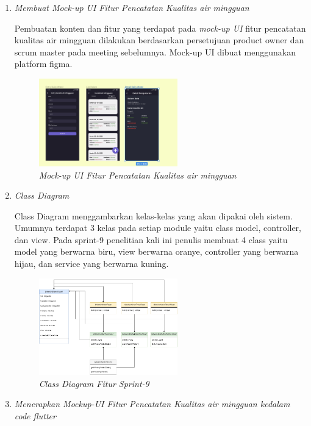 \begin{enumerate}[listparindent=2em]
	
	\item{\textit{Membuat Mock-up UI Fitur Pencatatan Kualitas air mingguan}}
	
	Pembuatan konten dan fitur yang terdapat pada \textit{mock-up UI} fitur pencatatan kualitas air mingguan dilakukan berdasarkan persetujuan product owner dan scrum master pada meeting sebelumnya. Mock-up UI dibuat menggunakan platform figma.
	
	\begin{figure}[H]
	\centering
	\includegraphics[keepaspectratio, width=6cm]{gambar/mockupairmingguan}
	\caption{\textit{Mock-up UI Fitur Pencatatan Kualitas air mingguan}}
	\label{gambar:mockupairmingguan}
	\end{figure}

	\item{\textit{Class Diagram}}
	
	Class Diagram menggambarkan kelas-kelas yang akan dipakai oleh sistem. Umumnya terdapat 3 kelas pada setiap module yaitu class model, controller, dan view. Pada sprint-9 penelitian kali ini penulis membuat 4 class yaitu model yang berwarna biru, view berwarna oranye, controller yang berwarna hijau, dan service yang berwarna kuning.
	 
	 \begin{figure}[H]
	 \centering
	 \includegraphics[keepaspectratio, width=6cm]{gambar/weeklycd}
	 \caption{\textit{Class Diagram Fitur Sprint-9}}
	 \label{gambar:weeklycd}
	 \end{figure}

	\item{\textit{Menerapkan Mockup-UI Fitur Pencatatan Kualitas air mingguan kedalam code flutter}}
	

\end{enumerate}
